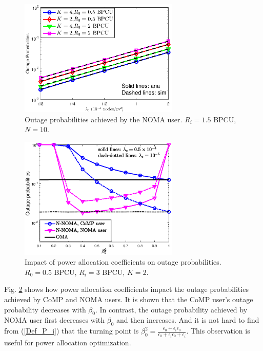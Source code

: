 \documentclass[10pt, doublecolumn]{IEEEtran}
\begin{document}
\begin{figure}[!t]
\vspace{-0em}
\setlength{\abovecaptionskip}{0em}   %
\setlength{\belowcaptionskip}{-1em}   %
\centering
\includegraphics[width=3in]{accuracy_NOMA.eps}
\caption{Outage probabilities achieved by the NOMA user. $R_i=1.5$ BPCU, $N=10$.}
\label{accuracy_NOMA}
\end{figure}

\begin{figure}[!t]
\vspace{-0em}
\setlength{\abovecaptionskip}{0em}   %
\setlength{\belowcaptionskip}{-1em}   %
\centering
\includegraphics[width=3in]{impact_beta.eps}
\caption{Impact of power allocation coefficients on outage probabilities. $R_0=0.5$ BPCU, $R_i=3$ BPCU, $K=2$.}
\label{impact_beta}
\end{figure}

{\color{black}Fig. \ref{impact_beta} shows how power allocation coefficients impact the outage probabilities achieved by CoMP and NOMA users. It is shown that the CoMP user's outage probability decreases with $\beta_0$. In contrast, the outage probability achieved by NOMA user first decreases with $\beta_0$ and then increases.
And it is not hard to find from (\ref{Def_P_i}) that the turning point is $\beta_0^2=\frac{\epsilon_0+\epsilon_i\epsilon_0}{\epsilon_0+\epsilon_i\epsilon_0+\epsilon_i}$. This observation is useful for power allocation optimization.}
\end{document}
